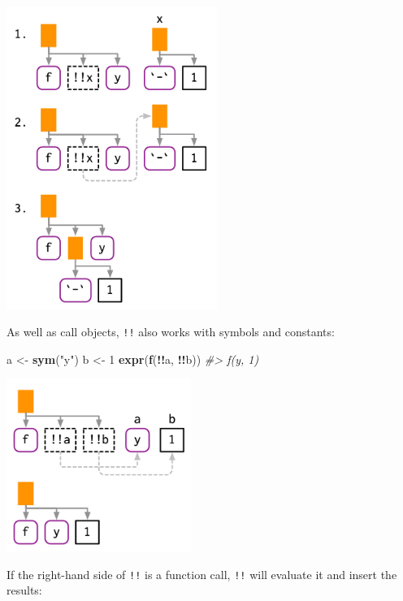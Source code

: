 \documentclass[]{book}
\newenvironment{Shaded}{\begin{snugshade}}{\end{snugshade}}
\newcommand{\CommentTok}[1]{\textcolor[rgb]{0.37,0.37,0.37}{\textit{#1}}}
\newcommand{\DecValTok}[1]{\textcolor[rgb]{0.06,0.06,0.06}{#1}}
\newcommand{\KeywordTok}[1]{\textcolor[rgb]{0.27,0.27,0.27}{\textbf{#1}}}
\newcommand{\NormalTok}[1]{#1}
\newcommand{\OperatorTok}[1]{\textcolor[rgb]{0.43,0.43,0.43}{\textbf{#1}}}
\newcommand{\StringTok}[1]{\textcolor[rgb]{0.5,0.5,0.5}{#1}}
\begin{document}
\begin{center}\includegraphics[width=2.7in]{diagrams/quotation/bang-bang} \end{center}

As well as call objects, \texttt{!!} also works with symbols and constants:

\begin{Shaded}
\begin{Highlighting}[]
\NormalTok{a <-}\StringTok{ }\KeywordTok{sym}\NormalTok{(}\StringTok{"y"}\NormalTok{)}
\NormalTok{b <-}\StringTok{ }\DecValTok{1}
\KeywordTok{expr}\NormalTok{(}\KeywordTok{f}\NormalTok{(}\OperatorTok{!!}\NormalTok{a, }\OperatorTok{!!}\NormalTok{b))}
\CommentTok{#> f(y, 1)}
\end{Highlighting}
\end{Shaded}

\begin{center}\includegraphics[width=2.36in]{diagrams/quotation/simple} \end{center}

If the right-hand side of \texttt{!!} is a function call, \texttt{!!} will evaluate it and insert the results:
\end{document}
